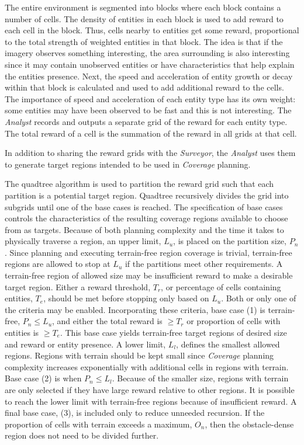 \documentclass{tamuccthesis}
\begin{document}
The entire environment is segmented into blocks where each block contains a number of cells. The density of entities in each block is used to add reward to each cell in the block. Thus, cells nearby to entities get some reward, proportional to the total strength of weighted entities in that block. The idea is that if the imagery observes something interesting, the area surrounding is also interesting since it may contain unobserved entities or have characteristics that help explain the entities presence. Next, the speed and acceleration of entity growth or decay within that block is calculated and used to add additional reward to the cells. The importance of speed and acceleration of each entity type has its own weight: some entities may have been observed to be fast and this is not interesting. The \textit{Analyst} records and outputs a separate grid of the reward for each entity type. The total reward of a cell is the summation of the reward in all grids at that cell. 

In addition to sharing the reward grids with the \textit{Surveyor}, the \textit{Analyst} uses them to generate target regions intended to be used in \textit{Coverage} planning. 

The quadtree algorithm is used to partition the reward grid such that each partition is a potential target region. Quadtree recursively divides the grid into subgrids until one of the base cases is reached. The specification of base cases controls the characteristics of the resulting coverage regions available to choose from as targets. Because of both planning complexity and the time it takes to physically traverse a region, an upper limit, $L_u$, is placed on the partition size, $P_n$. Since planning and executing terrain-free region coverage is trivial, terrain-free regions are allowed to stop at $L_u$ if the partitions meet other requirements. A terrain-free region of allowed size may be insufficient reward to make a desirable target region. Either a reward threshold, $T_r$, or percentage of cells containing entities, $T_e$, should be met before stopping only based on $L_u$. Both or only one of the criteria may be enabled. 
Incorporating these criteria, base case (1) is terrain-free, $P_n \leq L_u$, and either the total reward is $\geq T_r$ or proportion of cells with entities is $\geq T_e$. This base case yields terrain-free target regions of desired size and reward or entity presence. A lower limit, $L_l$, defines the smallest allowed regions. Regions with terrain should be kept small since \textit{Coverage} planning complexity increases exponentially with additional cells in regions with terrain. Base case (2) is when $P_n \leq L_l$. Because of the smaller size, regions with terrain are only selected if they have large reward relative to other regions. It is possible to reach the lower limit with terrain-free regions because of insufficient reward. A final base case, (3), is included only to reduce unneeded recursion. If the proportion of cells with terrain exceeds a maximum, $O_n$, then the obstacle-dense region does not need to be divided further. 
\end{document}

